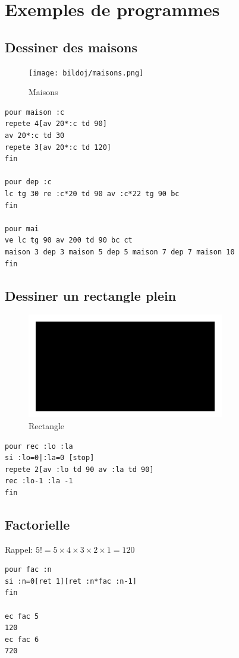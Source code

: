 \chapter{Exemples de programmes}
\section{Dessiner des maisons}

\begin{figure}[h]
\texttt{[image: bildoj/maisons.png]}
\caption{Maisons}
\end{figure}
\begin{verbatim}
pour maison :c
repete 4[av 20*:c td 90]
av 20*:c td 30
repete 3[av 20*:c td 120]
fin

pour dep :c
lc tg 30 re :c*20 td 90 av :c*22 tg 90 bc
fin

pour mai
ve lc tg 90 av 200 td 90 bc ct 
maison 3 dep 3 maison 5 dep 5 maison 7 dep 7 maison 10
fin
\end{verbatim} 
\pagebreak
\section{Dessiner un rectangle plein}
\begin{figure}[h]
\includegraphics*{bildoj/rectangle.png}
\caption{Rectangle}
\end{figure} 

\begin{verbatim}
pour rec :lo :la
si :lo=0|:la=0 [stop]
repete 2[av :lo td 90 av :la td 90]
rec :lo-1 :la -1
fin
\end{verbatim} 
\section{Factorielle}
\label{factorielle}
\noindent Rappel: $5!=5\times4\times3\times2\times1=120$ 
\begin{verbatim}
pour fac :n
si :n=0[ret 1][ret :n*fac :n-1]
fin

ec fac 5
120
ec fac 6
720
\end{verbatim} 

